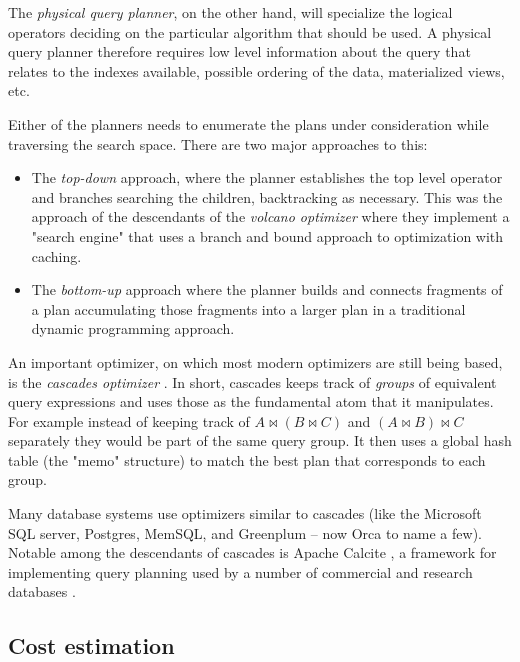 The \emph{physical query planner}, on the other hand, will specialize
the logical operators deciding on the particular algorithm that should
be used. A physical query planner therefore requires low level
information about the query that relates to the indexes available,
possible ordering of the data, materialized views, etc.

Either of the planners needs to enumerate the plans under
consideration while traversing the search space. There are two major
approaches to this:

\begin{itemize}
\item The \emph{top-down} approach, where the planner establishes the
  top level operator and branches searching the children, backtracking
  as necessary. This was the approach of the descendants of the
  \emph{volcano optimizer} \cite{graefeVolcanoOptimizerGenerator1993a}
  where they implement a "search engine" that uses a branch and bound
  approach to optimization with caching.
\item The \emph{bottom-up} approach where the planner builds and
  connects fragments of a plan accumulating those fragments into a
  larger plan in a traditional dynamic programming approach.
  \cite{raasveldtDuckdbEmbeddableAnalytical2019,kemperHyPerHybridOLTP2011}
\end{itemize}

An important optimizer, on which most modern optimizers are still
being based, is the \emph{cascades optimizer}
\cite{graefeCascadesFrameworkQuery1995}. In short, cascades keeps
track of \emph{groups} of equivalent query expressions and uses those
as the fundamental atom that it manipulates. For example instead of
keeping track of \(A \Join (B \Join C)\) and \((A \Join B) \Join C\)
separately they would be part of the same query group. It then uses a
global hash table (the "memo" structure) to match the best plan that
corresponds to each group.

Many database systems use optimizers similar to cascades (like the
Microsoft SQL server, Postgres,
MemSQL\cite{chenMemSQLQueryOptimizer2016}, and Greenplum -- now Orca
\cite{solimanOrcaModularQuery2014a} to name a few). Notable among the
descendants of cascades is Apache Calcite
\cite{begoliApacheCalciteFoundational2018}, a framework for
implementing query planning used by a number of commercial and
research databases \cite{nunesalonsoBuildingPolyglotData2020}.

\subsection{Cost estimation}

